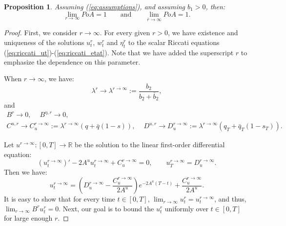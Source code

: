 \documentclass[11pt]{article}
\newtheorem{proposition}{Proposition}
\begin{document}
\begin{proposition}
	Assuming (\ref{eq:assumptions}), and assuming $b_1>0$, then:
	\begin{equation*}
			\lim_{r \to \infty} PoA = 1 \qquad \text{and} \qquad
			\lim_{\bar{r} \to \infty} PoA = 1.
	\end{equation*}
	\label{prop:r_bar_r}
\end{proposition}
\begin{proof}
	First, we consider $r \to \infty$. For every given $r >0$, we have existence and uniqueness of the solutions $u^{r}_t$, $w^{r}_t$ and $\eta^{r}_t$ to the scalar Riccati equations (\ref{eq:riccati_ut})-(\ref{eq:riccati_etat}). Note that we have added the superscript $r$ to emphasize the dependence on this parameter. 
	
	When $r \to \infty$, we have:
	\begin{equation*}
		\lambda^r \longrightarrow \lambda^{r\to\infty} := \frac{b_2}{b_2 + \bar{b}_2},
	\end{equation*}
	and
	\begin{equation*}
	\begin{array}{l}
		B^r \longrightarrow 0,\quad \ B^{\eta,r} \longrightarrow 0,\\
		C^{u,r} \longrightarrow C_u^{r\to \infty} := \lambda^{r \to \infty}(q + \bar{q}(1-s)),\quad \ D^{u,r} \to D_u^{r \to \infty} := \lambda^{r \to \infty}(q_T+ \bar{q}_T(1-s_T)).
	\end{array}
	\end{equation*}

	Let $u^{r \to \infty}:[0,T] \to \mathbb{R}$ be the solution to the linear first-order differential equation:
	\begin{equation}
		\left({u}^{r \to \infty}_t\right)' - 2A^u u_t^{r \to \infty} + C^{r \to \infty}_u = 0, \qquad u_T^{r \to \infty} = D^{r \to \infty}_u.
	\end{equation}
	Then we have:
	\begin{equation*}
	u_t^{r \to \infty} = \left(D^{r \to \infty}_u - \frac{C^{r \to \infty}_u}{2A^u} \right) e^{-2A^u (T-t)} +  \frac{C^{r \to \infty}_u}{2A^u}.
	\end{equation*}
	It is easy to show that for every time $t\in [0,T]$, $\lim_{r \to \infty}u^r_t=u^{r \to \infty}_t$, and thus, $\lim_{r \to \infty}B^ru^r_t=0$. Next, our goal is to bound the $u^r_t$ uniformly over $t \in [0,T]$ for large enough $r$.
	

\end{proof}
\end{document}
